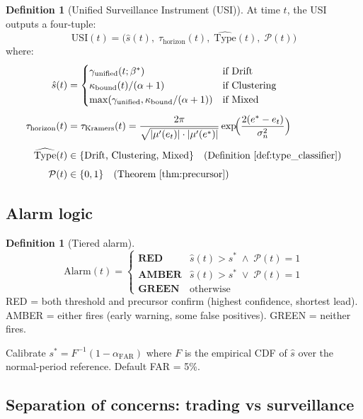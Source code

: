 \documentclass[11pt,a4paper]{article}
\theoremstyle{definition}
\newtheorem{definition}[theorem]{Definition}
\begin{document}
\begin{definition}[Unified Surveillance Instrument (USI)]
\label{def:usi}
At time $t$, the USI outputs a four-tuple:
\[
\mathrm{USI}(t) = \bigl(\hat s(t),\; \tau_\mathrm{horizon}(t),\;
\widehat{\mathrm{Type}}(t),\; \mathcal{P}(t) \bigr)
\]
where:
\begin{align*}
\hat s(t) &= \begin{cases}
\gamma_\mathrm{unified}(t;\beta^*) & \text{if Drift} \\
\kappa_\mathrm{bound}(t)/(\alpha+1) & \text{if Clustering} \\
\max(\gamma_\mathrm{unified},\kappa_\mathrm{bound}/(\alpha+1)) & \text{if Mixed}
\end{cases} \\[4pt]
\tau_\mathrm{horizon}(t) &= \tau_\mathrm{Kramers}(t)
= \frac{2\pi}{\sqrt{|\mu'(e_t)|\cdot|\mu'(e^*)|}}
\exp\!\Bigl(\frac{2(e^*-e_t)}{\sigma_n^2}\Bigr) \\[4pt]
\widehat{\mathrm{Type}}(t) &\in \{\text{Drift, Clustering, Mixed}\}
\quad\text{(Definition~\ref{def:type_classifier})} \\[4pt]
\mathcal{P}(t) &\in \{0,1\}
\quad\text{(Theorem~\ref{thm:precursor})}
\end{align*}
\end{definition}

\subsection{Alarm logic}

\begin{definition}[Tiered alarm]
\label{def:tiered_alarm}
\[
\mathrm{Alarm}(t) = \begin{cases}
\textbf{RED} & \hat s(t) > s^* \;\wedge\; \mathcal{P}(t) = 1 \\
\textbf{AMBER} & \hat s(t) > s^* \;\vee\; \mathcal{P}(t) = 1 \\
\textbf{GREEN} & \text{otherwise}
\end{cases}
\]
RED = both threshold and precursor confirm (highest confidence, shortest lead).
AMBER = either fires (early warning, some false positives).
GREEN = neither fires.

Calibrate $s^* = F^{-1}(1-\alpha_\mathrm{FAR})$ where $F$ is the
empirical CDF of $\hat s$ over the normal-period reference.
Default FAR = 5\%.
\end{definition}

\subsection{Separation of concerns: trading vs surveillance}
\end{document}
